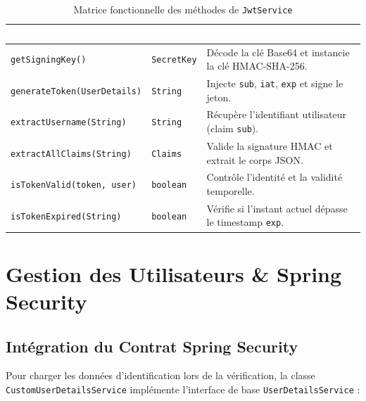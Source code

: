 \documentclass{rapportFSR}
\begin{document}
\begin{table}[H]
\centering
{}
\begin{tabular}{|p{4.8cm}|p{3.2cm}|p{6cm}|}
\hline
\rowcolor{header}
\textcolor{white}{Méthode} &
\textcolor{white}{Retour} &
\textcolor{white}{Rôle et Opération} \\
\hline
\texttt{getSigningKey()} & \texttt{SecretKey} & Décode la clé Base64 et instancie la clé HMAC-SHA-256. \\
\texttt{generateToken(UserDetails)} & \texttt{String} & Injecte \texttt{sub}, \texttt{iat}, \texttt{exp} et signe le jeton. \\
\texttt{extractUsername(String)} & \texttt{String} & Récupère l'identifiant utilisateur (claim \texttt{sub}). \\
\texttt{extractAllClaims(String)} & \texttt{Claims} & Valide la signature HMAC et extrait le corps JSON. \\
\texttt{isTokenValid(token, user)} & \texttt{boolean} & Contrôle l'identité et la validité temporelle. \\
\texttt{isTokenExpired(String)} & \texttt{boolean} & Vérifie si l'instant actuel dépasse le timestamp \texttt{exp}. \\
\hline
\end{tabular}
\caption{Matrice fonctionnelle des méthodes de \texttt{JwtService}}
\label{tab:jwt-methods}
\end{table}



\section{Gestion des Utilisateurs \& Spring Security}

\subsection{Intégration du Contrat Spring Security}
Pour charger les données d'identification lors de la vérification, la classe \texttt{CustomUserDetailsService} implémente l'interface de base \texttt{UserDetailsService} :
\end{document}
